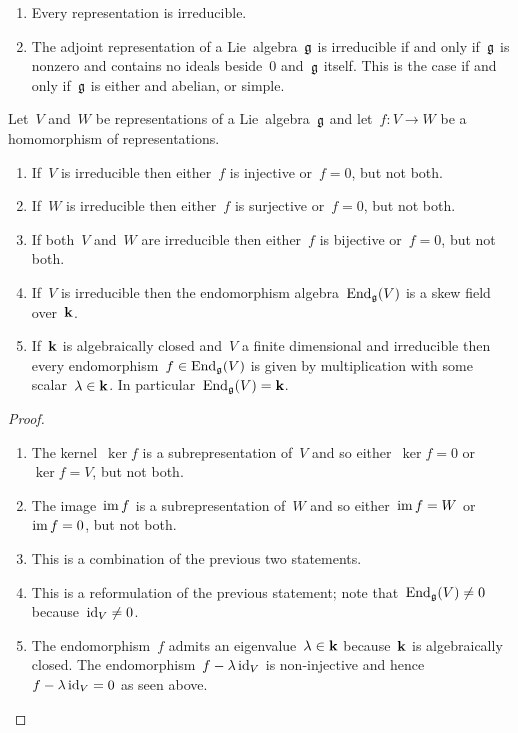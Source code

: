 \begin{example}
  \leavevmode
  \begin{enumerate}
    \item
      Every {\onedimensional} representation is irreducible.
    \item
      The adjoint representation of a Lie~algebra~$\mathfrak{g}$ is irreducible if and only if~$\mathfrak{g}$ is nonzero and contains no ideals beside~$0$ and~$\mathfrak{g}$ itself.
      This is the case if and only if~$\mathfrak{g}$ is either {\onedimensional} and abelian, or simple.
  \end{enumerate}
\end{example}


\begin{lemma}[Schur]
  Let~$V$ and~$W$ be representations of a Lie~algebra~$\mathfrak{g}$ and let~$f \colon V \to W$ be a homomorphism of representations.
  \begin{enumerate}
    \item
      If~$V$ is irreducible then either~$f$ is injective or~$f = 0$, but not both.
    \item
      If~$W$ is irreducible then either~$f$ is surjective or~$f = 0$, but not both.
    \item
      If both~$V$ and~$W$ are irreducible then either~$f$ is bijective or~$f = 0$, but not both.
    \item
      If~$V$ is irreducible then the endomorphism algebra~$\operatorname{End}_{\mathfrak{g}}(V)$ is a skew field over~$\mathbf{k}$.
    \item
      If~$\mathbf{k}$ is algebraically closed and~$V$ a finite dimensional and irreducible then every endomorphism~$f \in \operatorname{End}_{\mathfrak{g}}(V)$ is given by multiplication with some scalar~$\lambda \in \mathbf{k}$.
      In particular~$\operatorname{End}_{\mathfrak{g}}(V) = \mathbf{k}$.
  \end{enumerate}
\end{lemma}


\begin{proof}
  \leavevmode
  \begin{enumerate}
    \item
      The kernel~$\ker f$ is a subrepresentation of~$V$ and so either~$\ker f = 0$ or~$\ker f = V$, but not both.
    \item
      The image~$\operatorname{im} f$ is a subrepresentation of~$W$ and so either~$\operatorname{im} f = W$ or~$\operatorname{im} f = 0$, but not both.
    \item
      This is a combination of the previous two statements.
    \item
      This is a reformulation of the previous statement;
      note that~$\operatorname{End}_{\mathfrak{g}}(V) \neq 0$ because~$\operatorname{id}_V \neq 0$.
    \item
      The endomorphism~$f$ admits an eigenvalue~$\lambda \in \mathbf{k}$ because~$\mathbf{k}$ is algebraically closed.
      The endomorphism~$f - \lambda \operatorname{id}_V$ is non-injective and hence~$f - \lambda \operatorname{id}_V = 0$ as seen above.
    \qedhere
  \end{enumerate}
\end{proof}




